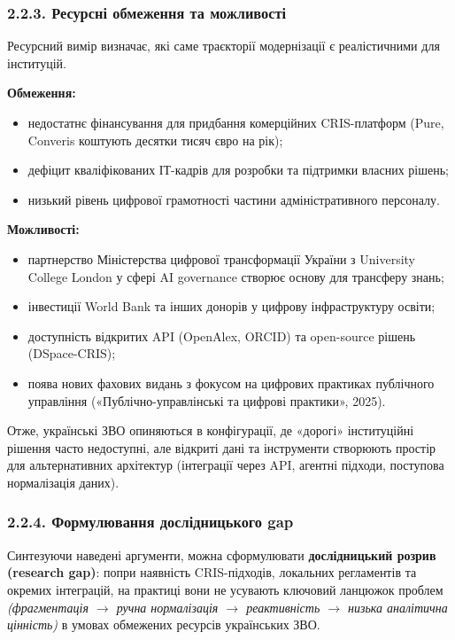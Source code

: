 \subsubsection*{2.2.3. Ресурсні обмеження та можливості}

Ресурсний вимір визначає, які саме траєкторії модернізації є реалістичними для інституцій.

\textbf{Обмеження:}
\begin{itemize}[leftmargin=*,itemsep=0.2em]
\item недостатнє фінансування для придбання комерційних CRIS-платформ (Pure, Converis коштують десятки тисяч євро на рік);
\item дефіцит кваліфікованих ІТ-кадрів для розробки та підтримки власних рішень;
\item низький рівень цифрової грамотності частини адміністративного персоналу.
\end{itemize}

\textbf{Можливості:}
\begin{itemize}[leftmargin=*,itemsep=0.2em]
\item партнерство Міністерства цифрової трансформації України з University College London у сфері AI governance створює основу для трансферу знань;
\item інвестиції World Bank та інших донорів у цифрову інфраструктуру освіти;
\item доступність відкритих API (OpenAlex, ORCID) та open-source рішень (DSpace-CRIS);
\item поява нових фахових видань з фокусом на цифрових практиках публічного управління («Публічно-управлінські та цифрові практики», 2025).
\end{itemize}

Отже, українські ЗВО опиняються в конфігурації, де «дорогі» інституційні рішення часто недоступні, але відкриті дані та інструменти створюють простір для альтернативних архітектур (інтеграції через API, агентні підходи, поступова нормалізація даних).

\subsubsection*{2.2.4. Формулювання дослідницького gap}

Синтезуючи наведені аргументи, можна сформулювати \textbf{дослідницький розрив (research gap)}: попри наявність CRIS-підходів, локальних регламентів та окремих інтеграцій, на практиці вони не усувають ключовий ланцюжок проблем \textit{(фрагментація $\rightarrow$ ручна нормалізація $\rightarrow$ реактивність $\rightarrow$ низька аналітична цінність)} в умовах обмежених ресурсів українських ЗВО.

